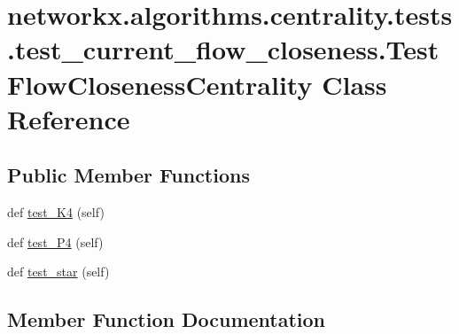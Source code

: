 \hypertarget{classnetworkx_1_1algorithms_1_1centrality_1_1tests_1_1test__current__flow__closeness_1_1TestFlowClosenessCentrality}{}\section{networkx.\+algorithms.\+centrality.\+tests.\+test\+\_\+current\+\_\+flow\+\_\+closeness.\+Test\+Flow\+Closeness\+Centrality Class Reference}
\label{classnetworkx_1_1algorithms_1_1centrality_1_1tests_1_1test__current__flow__closeness_1_1TestFlowClosenessCentrality}
\subsection*{Public Member Functions}
\begin{DoxyCompactItemize}
\item 
def \hyperlink{classnetworkx_1_1algorithms_1_1centrality_1_1tests_1_1test__current__flow__closeness_1_1TestFlowClosenessCentrality_adcfe9cf37c02ce4af60e20e75925b6fb}{test\+\_\+\+K4} (self)
\item 
def \hyperlink{classnetworkx_1_1algorithms_1_1centrality_1_1tests_1_1test__current__flow__closeness_1_1TestFlowClosenessCentrality_ac6718ad1d3715cc4cbdbb32aecd23d55}{test\+\_\+\+P4} (self)
\item 
def \hyperlink{classnetworkx_1_1algorithms_1_1centrality_1_1tests_1_1test__current__flow__closeness_1_1TestFlowClosenessCentrality_acd510c46b5c99cebf2cfcabd970d938b}{test\+\_\+star} (self)
\end{DoxyCompactItemize}


\subsection{Member Function Documentation}
\mbox{\label{classnetworkx_1_1algorithms_1_1centrality_1_1tests_1_1test__current__flow__closeness_1_1TestFlowClosenessCentrality_adcfe9cf37c02ce4af60e20e75925b6fb}} 
